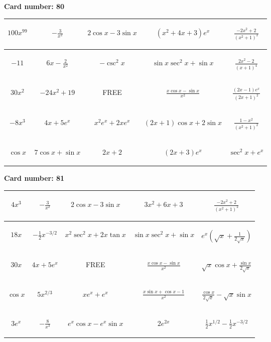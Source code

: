 \documentclass{article}
\newcommand{\entry}[1]{\begin{minipage}[t][2.75cm][t]{4cm} \vspace{1cm} \begin{center}#1\end{center} \end{minipage}}
\newcommand{\freespace}{\entry{FREE}}
\newcommand{\cardnumber}[1]{\noindent \textbf{Card number: #1} \bigskip}
\begin{document}
\pagebreak

\cardnumber{80}
\begin{center}
\begin{tabular}{|*{5}{c|}}
    \hline
    \entry{$100x^{99}$} & \entry{$-\frac{3}{x^2}$} & \entry{$2 \cos x - 3 \sin x$} & \entry{$(x^2 + 4x + 3) e^x$} & \entry{$\frac{-2x^2 + 2}{(x^2 + 1)^2}$} \\ \hline
    \entry{$-11$} & \entry{$6x - \frac{2}{x^2}$} & \entry{$-\csc^2 x$} & \entry{$\sin x \sec^2 x + \sin x$} & \entry{$\frac{2x^2 - 2}{(x + 1)^4}$} \\ \hline
    \entry{$30x^2$} & \entry{$-24x^2 + 19$} & \freespace & \entry{$\frac{x \cos x - \sin x}{x^2}$} & \entry{$\frac{(2x - 1) e^x}{(2x + 1)^2}$} \\ \hline
    \entry{$-8x^3$} & \entry{$4x + 5e^x$} & \entry{$x^2 e^x + 2x e^x$} & \entry{$(2x + 1) \cos x + 2 \sin x$} & \entry{$\frac{1 - x^2}{(x^2 + 1)^2}$} \\ \hline
    \entry{$\cos x$} & \entry{$7 \cos x + \sin x$} & \entry{$2x + 2$} & \entry{$(2x + 3) e^x$} & \entry{$\sec^2 x + e^x$} \\ \hline
\end{tabular}
\end{center}

\pagebreak

\cardnumber{81}
\begin{center}
\begin{tabular}{|*{5}{c|}}
    \hline
    \entry{$4x^3$} & \entry{$-\frac{3}{x^2}$} & \entry{$2 \cos x - 3 \sin x$} & \entry{$3x^2 + 6x + 3$} & \entry{$\frac{-2x^2 + 2}{(x^2 + 1)^2}$} \\ \hline
    \entry{$18x$} & \entry{$-\frac{1}{2} x^{-3/2}$} & \entry{$x^2 \sec^2 x + 2x \tan x$} & \entry{$\sin x \sec^2 x + \sin x$} & \entry{$e^x \left(\sqrt{x} + \frac{1}{2\sqrt{x}}\right)$} \\ \hline
    \entry{$30x$} & \entry{$4x + 5e^x$} & \freespace & \entry{$\frac{x \cos x - \sin x}{x^2}$} & \entry{$\sqrt{x} \cos x + \frac{\sin x}{2 \sqrt{x}}$} \\ \hline
    \entry{$\cos x$} & \entry{$5x^{2/3}$} & \entry{$x e^x + e^x$} & \entry{$\frac{x \sin x + \cos x - 1}{x^2}$} & \entry{$\frac{\cos x}{2 \sqrt{x}} - \sqrt{x} \sin x$} \\ \hline
    \entry{$3e^x$} & \entry{$-\frac{8}{x^3}$} & \entry{$e^x \cos x - e^x \sin x$} & \entry{$2e^{2x}$} & \entry{$\frac{1}{2} x^{1/2} - \frac{1}{2} x^{-3/2}$} \\ \hline
\end{tabular}
\end{center}
\end{document}
